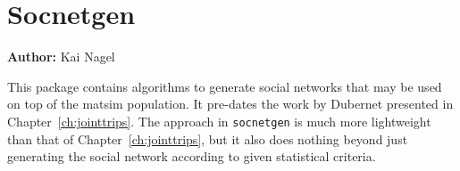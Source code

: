 \chapter{Socnetgen}
\label{sec:contrib-socnetgen}

\hfill \textbf{Author:} Kai Nagel



This package contains algorithms to generate social networks that may be used on top of the \gls{matsim} population.  It pre-dates the work by Dubernet presented in Chapter~\ref{ch:jointtrips}.  The approach in \lstinline{socnetgen} is much more lightweight than that of Chapter~\ref{ch:jointtrips}, but it also does nothing beyond just generating the social network according to given statistical criteria.

